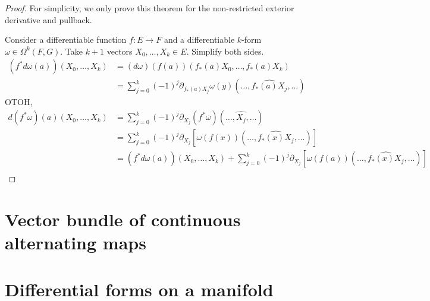 \begin{proof}
  For simplicity, we only prove this theorem
  for the non-restricted exterior derivative and pullback.

  Consider a differentiable function \(f\colon E \to F\)
  and a differentiable \(k\)-form \(\omega\in \Omega^{k}(F, G)\).
  Take \(k+1\) vectors \(X_{0}, \dots, X_{k}\in E\).
  Simplify both sides.
  \begin{align*}
    (f^{*}d\omega(a))(X_{0}, \dots, X_{k})
    &=(d\omega)(f(a))(f_{*}(a)X_{0}, \dots, f_{*}(a)X_{k})\\
    &=\sum_{j=0}^{k}{(-1)}^{j}\partial_{f_{*}(a)X_{j}}\omega(y)(\dots, \widehat{f_{*}(a)X_{j}}, \dots)
  \end{align*}
  OTOH,
  \begin{align*}
    d(f^{*}\omega)(a)(X_{0}, \dots, X_{k})
    &=\sum_{j=0}^{k}{(-1)}^{j}\partial_{X_{j}}(f^{*}\omega)(\dots, \widehat{X_{j}}, \dots)\\
    &=\sum_{j=0}^{k}{(-1)}^{j}\partial_{X_{j}}\left[\omega(f(x))(\dots, \widehat{f_{*}(x)X_{j}}, \dots)\right]\\
    &=(f^{*}d\omega(a))(X_{0}, \dots, X_{k}) + \sum_{j=0}^{k}{(-1)}^{j}\partial_{X_{j}}\left[\omega(f(a))(\dots, \widehat{f_{*}(x)X_{j}}, \dots)\right]\\
  \end{align*}
\end{proof}
\chapter{Vector bundle of continuous alternating maps}%
\label{cha:vect-bundle-cont}

\chapter{Differential forms on a manifold}%
\label{cha:diff-forms-manif}

